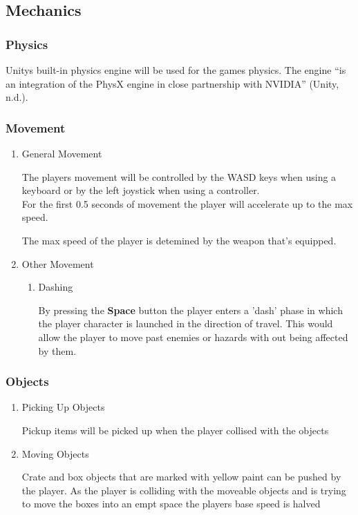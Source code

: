 \documentclass{article}
\begin{document}
\subsection{Mechanics}
\label{sec:orgfa20dbf}
\subsubsection{Physics}
\label{sec:org05b86f5}
Unitys built-in physics engine will be used for the games physics.
The engine ``is an integration of the PhysX engine in close partnership with NVIDIA'' (Unity, n.d.).
\subsubsection{Movement}
\label{sec:org381f800}
\begin{enumerate}
\item General Movement
\label{sec:orgebaa256}

The players movement will be controlled by the WASD keys when using a keyboard or by the left joystick when using a controller. \\[0pt]

For the first 0.5 seconds of movement the player will accelerate up to the max speed.

The max speed of the player is detemined by the weapon that's equipped.
\item Other Movement
\label{sec:orgcb6797b}
\begin{enumerate}
\item Dashing
\label{sec:org1e4cf56}

By pressing the \textbf{Space} button the player enters a 'dash' phase in which the player character is launched in the direction of travel.
This would allow the player to move past enemies or hazards with out being affected by them.
\end{enumerate}
\end{enumerate}
\subsubsection{Objects}
\label{sec:org32fb163}
\begin{enumerate}
\item Picking Up Objects
\label{sec:org6cd2db5}

Pickup items will be picked up when the player collised with the objects
\item Moving Objects
\label{sec:orgab28fff}

Crate and box objects that are marked with yellow paint can be pushed by the player.
As the player is colliding with the moveable objects and is trying to move the boxes into an empt space the players base speed is halved
\end{enumerate}
\end{document}

